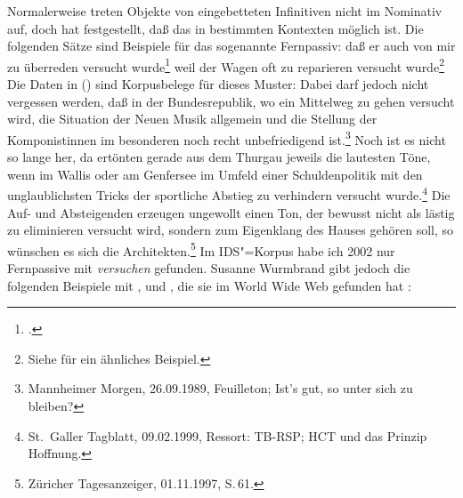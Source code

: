 Normalerweise treten Objekte von eingebetteten Infinitiven nicht im Nominativ auf,
doch  \citet[--176]{Hoehle78a} hat festgestellt, daß das in bestimmten Kontexten möglich ist.
Die folgenden Sätze sind Beispiele für das sogenannte Fernpassiv:
\eal
\ex{}
daß er auch von mir zu überreden versucht wurde\footnote{
        .%
}
\ex\label{bsp-zu-reparieren-versucht-wurde}
weil    der Wagen oft zu reparieren versucht wurde\footnote{
  Siehe  für ein ähnliches Beispiel.
}
\zl
Die Daten in () sind Korpusbelege für dieses Muster:
\eal
\ex Dabei darf jedoch nicht vergessen werden, daß in der Bundesrepublik, wo ein Mittelweg zu gehen versucht wird, 
die Situation der Neuen Musik allgemein und die Stellung der Komponistinnen im besonderen noch recht unbefriedigend ist.\footnote{
Mannheimer Morgen, 26.09.1989, Feuilleton; Ist's gut, so unter sich zu bleiben?
}
\ex Noch ist es nicht so lange her, da ertönten gerade aus dem Thurgau jeweils die lautesten Töne, 
    wenn im Wallis oder am Genfersee im Umfeld einer Schuldenpolitik mit den unglaublichsten Tricks 
    der sportliche Abstieg zu verhindern versucht wurde.\footnote{
St.\ Galler Tagblatt, 09.02.1999, Ressort: TB-RSP; HCT und das Prinzip Hoffnung.%
}
\ex Die Auf- und Absteigenden erzeugen ungewollt einen Ton,
        der bewusst nicht als lästig zu eliminieren versucht wird, 
    sondern zum Eigenklang des Hauses gehören soll, so wünschen es sich die Architekten.\footnote{
Züricher Tagesanzeiger, 01.11.1997, S.\,61.%
}
\zl
Im IDS"=Korpus habe ich 2002 nur Fernpassive mit \emph{versuchen} gefunden. Susanne
Wurmbrand gibt jedoch die folgenden Beispiele mit ,  und ,
die sie im World Wide Web gefunden hat \citep{Wurmbrand2003a}:

